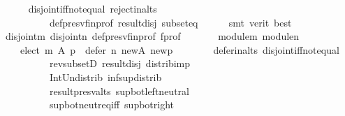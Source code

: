 \begin{isabellebody}
\ \ \ \ \isamarkupfalse%
\ disjoint{\isacharunderscore}{\kern0pt}iff{\isacharunderscore}{\kern0pt}not{\isacharunderscore}{\kern0pt}equal\ reject{\isacharunderscore}{\kern0pt}in{\isacharunderscore}{\kern0pt}alts\isanewline
\ \ \ \ \ \ \ \ \ \ def{\isacharunderscore}{\kern0pt}presv{\isacharunderscore}{\kern0pt}fin{\isacharunderscore}{\kern0pt}prof\ result{\isacharunderscore}{\kern0pt}disj\ subset{\isacharunderscore}{\kern0pt}eq\isanewline
\ \ \ \ \isamarkupfalse%
\ {\isacharparenleft}{\kern0pt}smt\ {\isacharparenleft}{\kern0pt}verit{\isacharcomma}{\kern0pt}\ best{\isacharparenright}{\kern0pt}{\isacharparenright}{\kern0pt}\isanewline
\ \ \isamarkupfalse%
\ disjoint{\isacharunderscore}{\kern0pt}m\ disjoint{\isacharunderscore}{\kern0pt}n\ def{\isacharunderscore}{\kern0pt}presv{\isacharunderscore}{\kern0pt}fin{\isacharunderscore}{\kern0pt}prof\ f{\isacharunderscore}{\kern0pt}prof\isanewline
\ \ \ \ \ \ \ module{\isacharunderscore}{\kern0pt}m\ module{\isacharunderscore}{\kern0pt}n\ \isamarkupfalse%
\ {}{\isacharcolon}{\kern0pt}\isanewline
\ \ \ \ {\isachardoublequoteopen}{\isacharparenleft}{\kern0pt}elect\ m\ A\ p\ {\isasyminter}\ defer\ n\ {\isacharquery}{\kern0pt}new{\isacharunderscore}{\kern0pt}A\ {\isacharquery}{\kern0pt}new{\isacharunderscore}{\kern0pt}p{\isacharparenright}{\kern0pt}\ {\isacharequal}{\kern0pt}\ {\isacharbraceleft}{\kern0pt}{\isacharbraceright}{\kern0pt}{\isachardoublequoteclose}\isanewline
\ \ \ \ \isamarkupfalse%
\ defer{\isacharunderscore}{\kern0pt}in{\isacharunderscore}{\kern0pt}alts\ disjoint{\isacharunderscore}{\kern0pt}iff{\isacharunderscore}{\kern0pt}not{\isacharunderscore}{\kern0pt}equal\isanewline
\ \ \ \ \ \ \ \ \ \ rev{\isacharunderscore}{\kern0pt}subsetD\ result{\isacharunderscore}{\kern0pt}disj\ distrib{\isacharunderscore}{\kern0pt}imp{}\isanewline
\ \ \ \ \ \ \ \ \ \ Int{\isacharunderscore}{\kern0pt}Un{\isacharunderscore}{\kern0pt}distrib\ inf{\isacharunderscore}{\kern0pt}sup{\isacharunderscore}{\kern0pt}distrib{}\isanewline
\ \ \ \ \ \ \ \ \ \ result{\isacharunderscore}{\kern0pt}presv{\isacharunderscore}{\kern0pt}alts\ sup{\isacharunderscore}{\kern0pt}bot{\isachardot}{\kern0pt}left{\isacharunderscore}{\kern0pt}neutral\isanewline
\ \ \ \ \ \ \ \ \ \ sup{\isacharunderscore}{\kern0pt}bot{\isachardot}{\kern0pt}neutr{\isacharunderscore}{\kern0pt}eq{\isacharunderscore}{\kern0pt}iff\ sup{\isacharunderscore}{\kern0pt}bot{\isacharunderscore}{\kern0pt}right\ {\isachardoublequoteopen}{}{\isachardoublequoteclose}\isanewline

\end{isabellebody}
